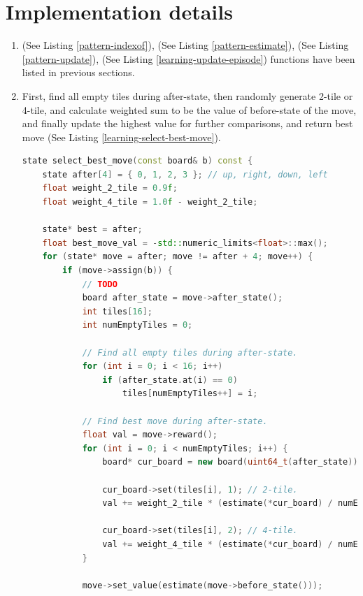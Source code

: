 \section{Implementation details}
\begin{enumerate}
	\item {} (See Listing \ref{pattern-indexof}),  (See Listing \ref{pattern-estimate}), 
	 (See Listing \ref{pattern-update}),  (See Listing \ref{learning-update-episode}) functions have been listed in previous sections.
	\item First, find all empty tiles during after-state, then randomly generate 2-tile or 4-tile, and 
	calculate weighted sum to be the value of before-state of the move, and finally
	update the highest value for further comparisons, and return best move (See Listing \ref{learning-select-best-move}).
\begin{lstlisting}[language=C++, caption={C++ code of \textcolor{blue}{select\_best\_move} function of class \textcolor{blue}{learning}.}, label={learning-select-best-move}]
state select_best_move(const board& b) const {
	state after[4] = { 0, 1, 2, 3 }; // up, right, down, left
	float weight_2_tile = 0.9f;
	float weight_4_tile = 1.0f - weight_2_tile;

	state* best = after;
	float best_move_val = -std::numeric_limits<float>::max();
	for (state* move = after; move != after + 4; move++) {
		if (move->assign(b)) {
			// TODO
			board after_state = move->after_state();
			int tiles[16];
			int numEmptyTiles = 0;

			// Find all empty tiles during after-state.
			for (int i = 0; i < 16; i++)
				if (after_state.at(i) == 0)
					tiles[numEmptyTiles++] = i;

			// Find best move during after-state.
			float val = move->reward();
			for (int i = 0; i < numEmptyTiles; i++) {
				board* cur_board = new board(uint64_t(after_state));

				cur_board->set(tiles[i], 1); // 2-tile.
				val += weight_2_tile * (estimate(*cur_board) / numEmptyTiles);

				cur_board->set(tiles[i], 2); // 4-tile.
				val += weight_4_tile * (estimate(*cur_board) / numEmptyTiles);
			}
			
			move->set_value(estimate(move->before_state()));


\end{lstlisting}
\end{enumerate}
